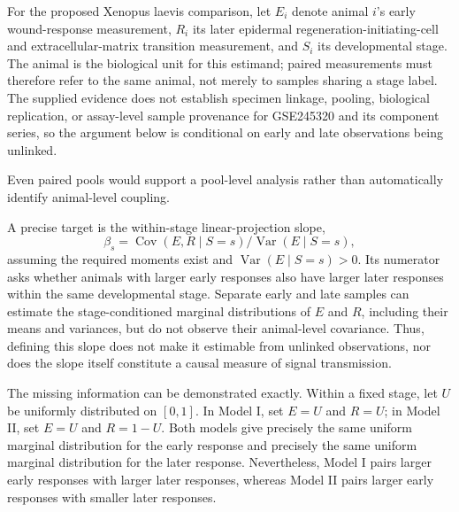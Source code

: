 \documentclass[11pt]{article}
\begin{document}
\begingroup\setlength{\fboxsep}{9pt}
\noindent{}\endgroup\par\medskip
For the proposed Xenopus laevis comparison, let $E_i$ denote animal $i$\textquoteright{}s early wound-response measurement, $R_i$ its later epidermal regeneration-initiating-cell and extracellular-matrix transition measurement, and $S_i$ its developmental stage. The animal is the biological unit for this estimand; paired measurements must therefore refer to the same animal, not merely to samples sharing a stage label. The supplied evidence does not establish specimen linkage, pooling, biological replication, or assay-level sample provenance for GSE245320 and its component series, so the argument below is conditional on early and late observations being unlinked.

Even paired pools would support a pool-level analysis rather than automatically identify animal-level coupling.

A precise target is the within-stage linear-projection slope, \[\beta_s=\operatorname{Cov}(E,R\mid S=s)/\operatorname{Var}(E\mid S=s),\] assuming the required moments exist and $\operatorname{Var}(E\mid S=s)>0$. Its numerator asks whether animals with larger early responses also have larger later responses within the same developmental stage. Separate early and late samples can estimate the stage-conditioned marginal distributions of $E$ and $R$, including their means and variances, but do not observe their animal-level covariance. Thus, defining this slope does not make it estimable from unlinked observations, nor does the slope itself constitute a causal measure of signal transmission.

The missing information can be demonstrated exactly. Within a fixed stage, let $U$ be uniformly distributed on $[0,1]$. In Model I, set $E=U$ and $R=U$; in Model II, set $E=U$ and $R=1-U$. Both models give precisely the same uniform marginal distribution for the early response and precisely the same uniform marginal distribution for the later response. Nevertheless, Model I pairs larger early responses with larger later responses, whereas Model II pairs larger early responses with smaller later responses.
\end{document}
